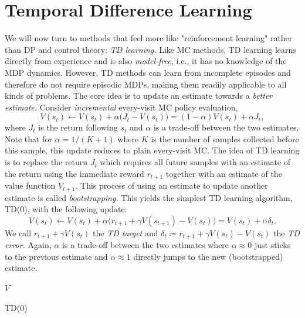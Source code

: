 \chapter{Temporal Difference Learning}
	\label{c:td}

	We will now turn to methods that feel more like "reinforcement learning" rather than \ac{DP} and control theory: \emph{\ac{TD} learning.} Like \ac{MC} methods, \ac{TD} learning learns directly from experience and is also \emph{model-free,} i.e., it has no knowledge of the \ac{MDP} dynamics. However, \ac{TD} methods can learn from incomplete episodes and therefore do not require episodic \acp{MDP}, making them readily applicable to all kinds of problems. The core idea is to update an estimate towards a \emph{better estimate.} Consider \emph{incremental} every-visit \ac{MC} policy evaluation,
	\begin{equation}
		V(s_t) \gets V(s_t) + \alpha \bigl( J_t - V(s_t) \bigr) = (1 - \alpha) V(s_t) + \alpha J_t,  \label{eq:mcUpdate}
	\end{equation}
	where \(J_t\) is the return following \(s_t\) and \(\alpha\) is a trade-off between the two estimates. Note that for \( \alpha = 1/(K + 1) \) where \(K\) is the number of samples collected before this sample, this update reduces to plain every-visit \ac{MC}. The idea of \ac{TD} learning is to replace the return \(J_t\) which requires all future samples with an estimate of the return using the immediate reward \(r_{t + 1}\) together with an estimate of the value function \(V_{t + 1}\). This process of using an estimate to update another estimate is called \emph{bootstrapping.} This yields the simplest \ac{TD} learning algorithm, TD(\(0\)), with the following update:
	\begin{equation}
		V(s_t) \gets V(s_t) + \alpha \bigl( r_{t + 1} + \gamma V(s_{t + 1}) - V(s_t) \bigr) = V(s_t) + \alpha \delta_t.  \label{eq:tdUpdate}
	\end{equation}
	We call \( r_{t + 1} + \gamma V(s_t) \) the \emph{\ac{TD} target} and \( \delta_t \coloneqq r_{t + 1} + \gamma V(s_t) - V(s_t) \) the \emph{\ac{TD} error.} Again, \(\alpha\) is a trade-off between the two estimates where \(\alpha \approx 0\) just sticks to the previous estimate and \(\alpha \approx 1\) directly jumps to the new (bootstrapped) estimate.

	\begin{algorithm}  \DontPrintSemicolon
		\Return \(V\) \;
		\caption{TD(\(0\))}
		\label{alg:td0}
	\end{algorithm}

